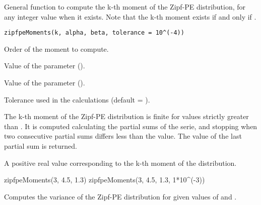 \documentclass[letterpaper]{book}
\begin{document}
%
\begin{Description}\relax
General function to compute the k-th moment of the Zipf-PE distribution, for any integer value
 when it exists. Note that the k-th moment exists if and
only if .
\end{Description}
%
\begin{Usage}
\begin{verbatim}
zipfpeMoments(k, alpha, beta, tolerance = 10^(-4))
\end{verbatim}
\end{Usage}
%
\begin{Arguments}
\begin{ldescription}
\item[\code{k}] Order of the moment to compute.

\item[\code{alpha}] Value of the \eqn{\alpha}{} parameter ().

\item[\code{beta}] Value of the \eqn{\beta}{} parameter (\eqn{\beta \in (-\infty, +\infty)}{}).

\item[\code{tolerance}] Tolerance used in the calculations (default = ).
\end{ldescription}
\end{Arguments}
%
\begin{Details}\relax
The k-th moment of the Zipf-PE distribution is finite for \eqn{\alpha}{} values strictly greater than .
It is computed calculating the partial sums of the serie, and stopping when two
consecutive partial sums differs less than the  value.
The value of the last partial sum is returned.
\end{Details}
%
\begin{Value}
A positive real value corresponding to the k-th moment of the distribution.
\end{Value}
%
\begin{Examples}
\begin{ExampleCode}
zipfpeMoments(3, 4.5, 1.3)
zipfpeMoments(3, 4.5, 1.3,  1*10^(-3))
\end{ExampleCode}
\end{Examples}
%
\begin{Description}\relax
Computes the variance of the Zipf-PE distribution for given values of \eqn{\alpha}{} and \eqn{\beta}{}.
\end{Description}
\end{document}

